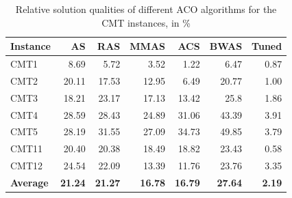 \documentclass[12pt,a4paper,oneside]{book}
\begin{document}
\begin{table}[]
\centering
\caption{Relative solution qualities of different ACO algorithms for the CMT instances, in \%}
\label{tbl:benchmark}
\begin{tabular}{|l|r|r|r|r|r|r|}
\hline
\textbf{Instance} & \textbf{AS} & \textbf{RAS} &\textbf{MMAS} & \textbf{ACS} & \textbf{BWAS} & \textbf{Tuned} \\ \hline
CMT1                            & 8.69                  & 5.72                   & 3.52                    & 1.22                   & 6.47                    & 0.87                     \\ \hline
CMT2                            & 20.11                 & 17.53                  & 12.95                   & 6.49                   & 20.77                   & 1.00                        \\ \hline
CMT3                            & 18.21                 & 23.17                  & 17.13                   & 13.42                  & 25.8                    & 1.86                     \\ \hline
CMT4                            & 28.59                 & 28.43                  & 24.89                   & 31.06                  & 43.39                   & 3.91                     \\ \hline
CMT5                            & 28.19                 & 31.55                  & 27.09                   & 34.73                  & 49.85                   & 3.79                     \\ \hline
CMT11                           & 20.40                 & 20.38                  & 18.49                   & 18.82                  & 23.43                   & 0.58                     \\ \hline
CMT12                           & 24.54                 & 22.09                  & 13.39                   & 11.76                  & 23.76                   & 3.35                     \\ \hline
\textbf{Average}             & \textbf{21.24}                 & \textbf{21.27}                  & \textbf{16.78}                   & \textbf{16.79}                   & \textbf{27.64}                    & \textbf{2.19}                    \\ \hline
\end{tabular}
\end{table}
\end{document}
